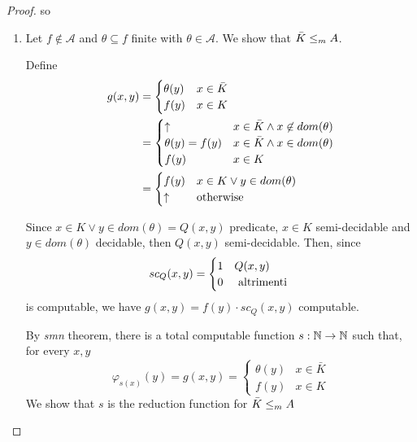 \begin{theorem}
\begin{proof}
  so
  \begin{enumerate}
    \item
    Let $ f\not\in \mathcal{A}$ and $\theta \subseteq f$ finite with $\theta \in \mathcal{A}$.
    We show that $
    \bar{K}\leq_m A $.

    Define
    \begin{equation*}
      \begin{aligned}
        g(x,y) & = \begin{cases}
          \theta(y) & x \in \bar{K} \\
          f(y) & x \in K
        \end{cases} \\
               & = \begin{cases}
                 \uparrow & x \in \bar{K} \land x \not\in dom(\theta) \\
                 \theta(y) = f(y) & x \in \bar{K} \land x \in dom(\theta) \\
                 f(y) & x\in K
               \end{cases}\\
               &= \begin{cases}
                 f(y) & x \in K\lor y\in dom(\theta) \\
                 \uparrow & $otherwise $
               \end{cases}
      \end{aligned}
    \end{equation*}

    Since $ x\in K\lor y\in dom(\theta) = Q(x,y)$ predicate, $ x\in K $
    semi-decidable and $ y \in dom(\theta) $ decidable, then $ Q(x,y) $
    semi-decidable.
    Then, since
    \begin{equation*}
    sc_Q(x,y) = \begin{cases}
        1 & Q(x,y) \\
        0 & $ altrimenti $
      \end{cases}
    \end{equation*}
  is computable, we have $ g(x, y) = f(y) \cdot sc_Q(x,y) $ computable.

    By \emph{smn} theorem, there is a total computable function $
    s:\mathbb{N}\rightarrow\mathbb{N} $ such that, for every $x, y$
    \begin{equation*}
      \varphi_{s(x)}(y) = g(x,y) = \begin{cases}
        \theta(y) & x \in \bar{K} \\
        f(y) & x \in K
      \end{cases}
    \end{equation*}
    We show that $s$ is the reduction function for $ \bar{K}\leq_m A $


\end{enumerate}
\end{proof}
\end{theorem}
